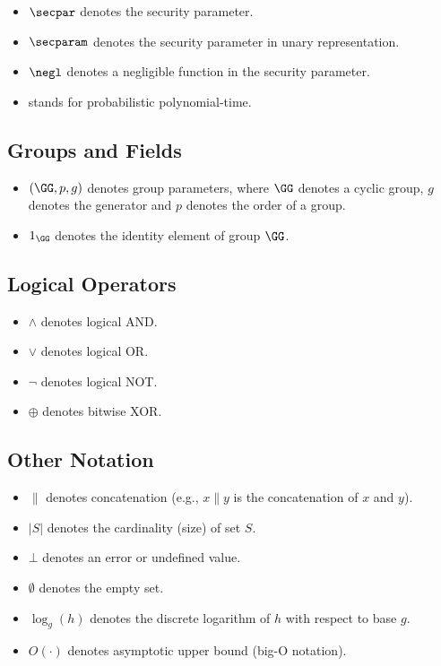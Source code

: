\begin{itemize}
  \item $\secpar$ denotes the security parameter.
  \item $\secparam$ denotes the security parameter in unary representation.
  \item $\negl$ denotes a negligible function in the security parameter.
  \item \ppt stands for probabilistic polynomial-time.
\end{itemize}

\subsection{Groups and Fields}

\begin{itemize}
  \item $\gparam$ denotes group parameters, where $\GG$ denotes a cyclic group, $g$ denotes the generator and $p$ denotes the order of a group.
  \item $1_\GG$ denotes the identity element of group $\GG$.
\end{itemize}

\subsection{Logical Operators}

\begin{itemize}
  \item $\wedge$ denotes logical AND.
  \item $\vee$ denotes logical OR.
  \item $\neg$ denotes logical NOT.
  \item $\oplus$ denotes bitwise XOR.
\end{itemize}

\subsection{Other Notation}

\begin{itemize}
  \item $\|$ denotes concatenation (e.g., $x \| y$ is the concatenation of $x$ and $y$).
  \item $|S|$ denotes the cardinality (size) of set $S$.
  \item $\bot$ denotes an error or undefined value.
  \item $\emptyset$ denotes the empty set.
  \item $\log_g(h)$ denotes the discrete logarithm of $h$ with respect to base $g$.
  \item $O(\cdot)$ denotes asymptotic upper bound (big-O notation).
\end{itemize}
